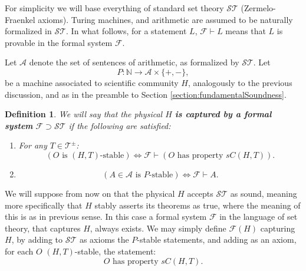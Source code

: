 \documentclass{amsart}  %
\numberwithin{equation}{section}
\newtheorem{definition}[equation]{Definition}
\theoremstyle{definition}
\theoremstyle{remark}
\begin{document}
{For simplicity we will base everything of standard set theory $\mathcal{ST}$ (Zermelo-Fraenkel axioms). Turing machines, and arithmetic are assumed to be naturally formalized in $\mathcal{ST}$. 
In what follows, for a statement $L$, $\mathcal{F} \vdash L$ means that $L$ is provable in the formal system $\mathcal{F}$.

Let $\mathcal{A}$ denote the set of sentences of arithmetic, as formalized by $\mathcal{ST}$. Let
\begin{equation*} P: \mathbb{N} \to  \mathcal{A} \times \{+, -\},
\end{equation*}
be a machine associated to scientific community $H$, analogously to the previous discussion, and as in the preamble to Section \ref{section:fundamentalSoundness}.
\begin{definition}
  We will say that the physical $H $ \textbf{\emph{is captured by a formal system}} $\mathcal{F}  \supset \mathcal{ST}$ if the following are satisfied:
\begin{enumerate}
\item  For any $T \in \mathcal{T} ^{\pm} $:
\begin{equation*}
   (O \text{ is $(H,T)$-stable}) \iff \mathcal{F} \vdash (O \text{ has property } sC (H,T)).
\end{equation*}
\item  
\begin{equation*}
   (A \in \mathcal{A} \text{ is $P$-stable}) \iff \mathcal{F} \vdash A.
\end{equation*}
\end{enumerate}
\end{definition}
We will suppose from now on that the physical $H$ accepts $\mathcal{ST}$  as sound, meaning more specifically that $H$ stably asserts its theorems as true, where the meaning of this is as in previous sense. 
In this case a formal system $\mathcal{F}$ in the language of set theory, that captures $H$, always exists. We may simply define $\mathcal{F} (H)$ capturing $H$, by adding to $\mathcal{ST}$ as axioms the $P$-stable statements, and adding as an axiom, for each $O$ $(H,T)$-stable, the statement:
\begin{equation*}
\text{$O$ has property $sC (H,T)$.}
\end{equation*}
}
\end{document}
